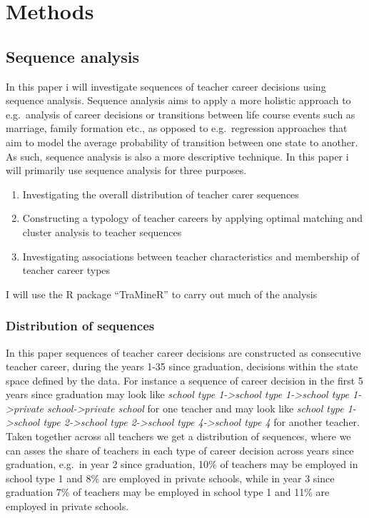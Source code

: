 \documentclass[
]{article}
\begin{document}
\hypertarget{methods}{%
\section{Methods}\label{methods}}

\hypertarget{sequence-analysis}{%
\subsection{Sequence analysis}\label{sequence-analysis}}

In this paper i will investigate sequences of teacher career decisions using sequence analysis. Sequence analysis aims to apply a more holistic approach to e.g.~analysis of career decisions or transitions between life course events such as marriage, family formation etc., as opposed to e.g.~regression approaches that aim to model the average probability of transition between one state to another. As such, sequence analysis is also a more descriptive technique. In this paper i will primarily use sequence analysis for three purposes.

\begin{enumerate}
\def\labelenumi{\arabic{enumi})}
\item
  Investigating the overall distribution of teacher carer sequences
\item
  Constructing a typology of teacher careers by applying optimal matching and cluster analysis to teacher sequences
\item
  Investigating associations between teacher characteristics and membership of teacher career types
\end{enumerate}

I will use the R package ``TraMineR'' to carry out much of the analysis

\hypertarget{distribution-of-sequences}{%
\subsubsection{Distribution of sequences}\label{distribution-of-sequences}}

In this paper sequences of teacher career decisions are constructed as consecutive teacher career, during the years 1-35 since graduation, decisions within the state space defined by the data. For instance a sequence of career decision in the first 5 years since graduation may look like \emph{school type 1-\textgreater school type 1-\textgreater school type 1-\textgreater private school-\textgreater private school} for one teacher and may look like \emph{school type 1-\textgreater school type 2-\textgreater school type 2-\textgreater school type 4-\textgreater school type 4} for another teacher. Taken together across all teachers we get a distribution of sequences, where we can asses the share of teachers in each type of career decision across years since graduation, e.g.~in year 2 since graduation, 10\% of teachers may be employed in school type 1 and 8\% are employed in private schools, while in year 3 since graduation 7\% of teachers may be employed in school type 1 and 11\% are employed in private schools.
\end{document}

